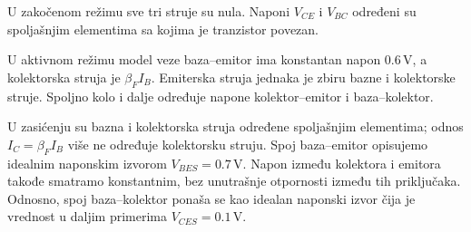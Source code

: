 U zakočenom režimu sve tri struje su nula. Naponi $V_{CE}$ i $V_{BC}$ određeni su spoljašnjim elementima sa kojima je tranzistor povezan.

U aktivnom režimu model veze baza–emitor ima konstantan napon $0.6\,\mathrm{V}$, a kolektorska struja je $\beta_F I_B$. Emiterska struja jednaka je zbiru bazne i kolektorske struje. Spoljno kolo i dalje određuje napone kolektor–emitor i baza–kolektor.

U zasićenju su bazna i kolektorska struja određene spoljašnjim elementima; odnos $I_C=\beta_F I_B$ više ne određuje kolektorsku struju. Spoj baza–emitor opisujemo idealnim naponskim izvorom $V_{BES}=0.7\,\mathrm{V}$. Napon između kolektora i emitora takođe smatramo konstantnim, bez unutrašnje otpornosti između tih priključaka. Odnosno, spoj baza–kolektor ponaša se kao idealan naponski izvor čija je vrednost u daljim primerima $V_{CES}=0.1\,\mathrm{V}$.
